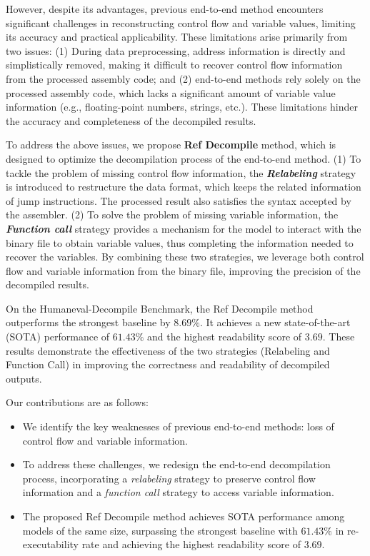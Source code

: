 However, despite its advantages, previous end-to-end method encounters significant challenges in reconstructing control flow and variable values, limiting its accuracy and practical applicability. These limitations arise primarily from two issues:
(1) During data preprocessing, address information is directly and simplistically removed, making it difficult to recover control flow information from the processed assembly code; and 
(2) end-to-end methods rely solely on the processed assembly code, which lacks a significant amount of variable value information (e.g., floating-point numbers, strings, etc.).
These limitations hinder the accuracy and completeness of the decompiled results.


To address the above issues, we propose \textbf{Ref Decompile} method, which is designed to optimize the decompilation process of the end-to-end method.
(1) To tackle the problem of missing control flow information, the \textbf{\textit{Relabeling}} strategy is introduced to restructure the data format, which keeps the related information of jump instructions.
The processed result also satisfies the syntax accepted by the assembler.
(2) To solve the problem of missing variable information, the \textbf{\textit{Function call}} strategy provides a mechanism for the model to interact with the binary file to obtain variable values, thus completing the information needed to recover the variables.
By combining these two strategies, we leverage both control flow and variable information from the binary file, improving the precision of the decompiled results.

On the Humaneval-Decompile Benchmark, the Ref Decompile method outperforms the strongest baseline by $8.69\%$. It achieves a new state-of-the-art (SOTA) performance of $61.43\%$ and the highest readability score of $3.69$. 
These results demonstrate the effectiveness of the two strategies (Relabeling and Function Call) in improving the correctness and readability of decompiled outputs.

Our contributions are as follows:
\begin{itemize}
    \item We identify the key weaknesses of previous end-to-end methods: loss of control flow and variable information.
    \item To address these challenges, we redesign the end-to-end decompilation process, incorporating a \textit{relabeling} strategy to preserve control flow information and a \textit{function call} strategy to access variable information.
    \item The proposed Ref Decompile method achieves SOTA performance among models of the same size, surpassing the strongest baseline with $61.43\%$ in re-executability rate and achieving the highest readability score of $3.69$.
\end{itemize}
